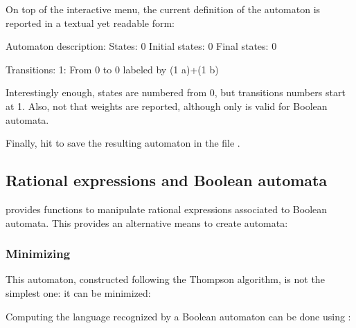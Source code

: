 On top of the interactive menu, the current definition of the
automaton is reported in a textual yet readable form:

\begin{shell}
Automaton description:
  States: 0
  Initial states: 0
  Final states: 0

  Transitions: 
    1: From 0 to 0 labeled by (1 a)+(1 b)  
\end{shell}

\noindent
Interestingly enough, states are numbered from 0, but transitions
numbers start at 1.  Also, not that weights are reported, although
only  is valid for Boolean automata.

Finally, hit  to save the resulting automaton in the file
.


\subsection{Rational expressions and Boolean automata}

\Vauc provides functions to manipulate rational expressions associated
to Boolean automata.  This provides an alternative means to create
automata:

\begin{center}
\end{center}

\subsubsection{Minimizing}

This automaton, constructed following the Thompson algorithm, is not
the simplest one: it can be minimized:

\begin{center}
\end{center}

\bigskip

Computing the language recognized by a Boolean automaton can be done
using :



